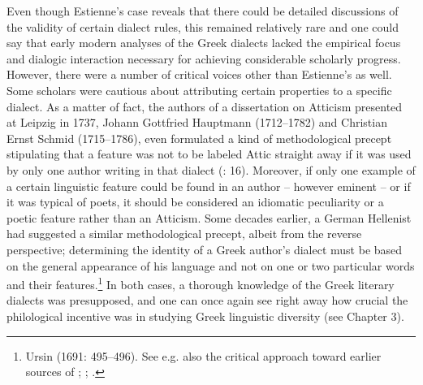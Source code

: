 Even though Estienne’s case reveals that there could be detailed discussions of the validity of certain dialect rules, this remained relatively rare and one could say that early modern analyses of the Greek dialects lacked the empirical focus and dialogic interaction necessary for achieving considerable scholarly progress. However, there were a number of critical voices other than Estienne’s as well. Some scholars were cautious about attributing certain properties to a specific dialect. As a matter of fact, the authors of a dissertation on Atticism presented at Leipzig in 1737, Johann Gottfried Hauptmann (1712–1782) and Christian Ernst Schmid (1715–1786), even formulated a kind of methodological precept stipulating that a feature was not to be labeled Attic straight away if it was used by only one author writing in that dialect (\citealt{Hauptmann1737}: 16). Moreover, if only one example of a certain linguistic feature could be found in an author – however eminent – or if it was typical of poets, it should be considered an idiomatic peculiarity or a poetic feature rather than an Atticism. Some decades earlier, a German Hellenist had suggested a similar methodological precept, albeit from the reverse perspective; determining the identity of a Greek author’s dialect must be based on the general appearance of his language and not on one or two particular words and their features.\footnote{Ursin (1691: 495–496). See e.g. also the critical approach toward earlier sources of \citet{Walper1589}; \citet[(.3\textsc{\textsuperscript{r}})]{Portus1603}; \citet[10-12]{Gedike1782}.} In both cases, a thorough knowledge of the Greek literary dialects was presupposed, and one can once again see right away how crucial the philological incentive was in studying Greek linguistic diversity (see Chapter 3).

